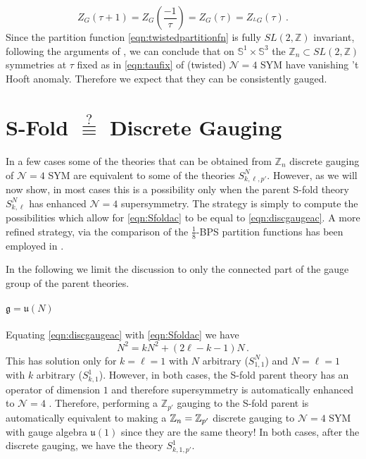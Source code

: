 \documentclass[main.tex]{subfiles}
\begin{document}
\begin{equation}
Z_G(\tau+1)=Z_G\left(\frac{-1}{\tau}\right)=Z_G(\tau)=Z_{{}^LG}(\tau)\,.
\end{equation}
Since the partition function \eqref{eqn:twistedpartitionfn} is fully $SL(2,\mathbb{Z})$ invariant, following the arguments of \cite{Seiberg:2018ntt}, we can conclude that on $\mathbb{S}^1\times\mathbb{S}^3$ the $\mathbb{Z}_n\subset SL(2,\mathbb{Z})$ symmetries at $\tau$ fixed as in \eqref{eqn:taufix} of (twisted) $\mathcal{N}=4$ SYM have vanishing 't Hooft anomaly. Therefore we expect that they can be consistently gauged.
\section{S-Fold \texorpdfstring{$\stackrel{?}{\equiv}$}{?=} Discrete Gauging}\label{sec:Sfolddiscgauge}
In a few cases some of the theories that can be obtained from $\mathbb{Z}_n$ discrete gauging of $\mathcal{N}=4$ SYM are equivalent to some of the theories $S^N_{k,\ell,p'}$. However, as we will now show, in most cases this is a possibility only when the parent S-fold theory $S^N_{k,\ell}$ has enhanced $\mathcal{N}=4$ supersymmetry. The strategy is simply to compute the possibilities which allow for \eqref{eqn:Sfoldac} to be equal to \eqref{eqn:discgaugeac}. A more refined strategy, via the comparison of the $\frac{1}{8}$-BPS partition functions has been employed in \cite{Arai:2018utu}. 

In the following we limit the discussion to only the connected part of the gauge group of the parent theories.
\paragraph{$\mathfrak{g}=\mathfrak{u}(N)$} Equating \eqref{eqn:discgaugeac} with \eqref{eqn:Sfoldac} we have
\begin{equation}
N^2=kN^2+(2\ell-k-1)N \, .
\end{equation}
This has solution only for $k=\ell=1$ with $N$ arbitrary ($S^N_{1,1}$) and $N=\ell=1$ with $k$ arbitrary ($S^1_{k,1}$). However, in both cases, the S-fold parent theory has an operator of dimension $1$ and therefore supersymmetry is automatically enhanced to $\mathcal{N}=4$ \cite{Aharony:2016kai,Aharony:2015oyb}. Therefore, performing a $\mathbb{Z}_{p'}$ gauging to the S-fold parent is automatically equivalent to making a $\mathbb{Z}_{n}=\mathbb{Z}_{p'}$ discrete gauging to $\mathcal{N}=4$ SYM with gauge algebra $\mathfrak{u}(1)$ since they are the same theory! In both cases, after the discrete gauging, we have the theory $S^1_{k,1,p'}$.
\end{document}
